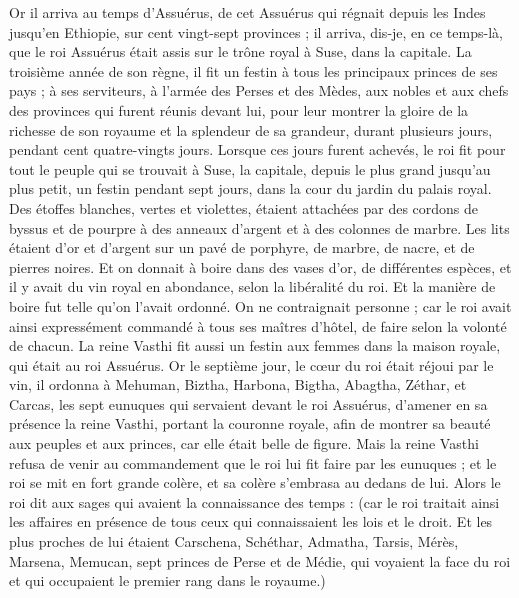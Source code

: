 \begin{multicols}{2}
\VerseOne{}Or il arriva au temps d’Assuérus, de cet Assuérus qui régnait depuis les Indes jusqu'en Ethiopie, sur cent vingt-sept provinces ;
il arriva, dis-je, en ce temps-là, que le roi Assuérus était assis sur le trône royal à Suse, dans la capitale.
La troisième année de son règne, il fit un festin à tous les principaux princes de ses pays ; à ses serviteurs, à l’armée des Perses et des Mèdes, aux nobles et aux chefs des provinces qui furent réunis devant lui,
pour leur montrer la gloire de la richesse de son royaume et la splendeur de sa grandeur, durant plusieurs jours, pendant cent quatre-vingts jours.
Lorsque ces jours furent achevés, le roi fit pour tout le peuple qui se trouvait à Suse, la capitale, depuis le plus grand jusqu'au plus petit, un festin pendant sept jours, dans la cour du jardin du palais royal.
Des étoffes blanches, vertes et violettes, étaient attachées par des cordons de byssus et de pourpre à des anneaux d'argent et à des colonnes de marbre. Les lits étaient d'or et d'argent sur un pavé de porphyre, de marbre, de nacre, et de pierres noires.
Et on donnait à boire dans des vases d'or, de différentes espèces, et il y avait du vin royal en abondance, selon la libéralité du roi.
Et la manière de boire fut telle qu’on l’avait ordonné. On ne contraignait personne ; car le roi avait ainsi expressément commandé à tous ses maîtres d’hôtel, de faire selon la volonté de chacun.
La reine Vasthi fit aussi un festin aux femmes dans la maison royale, qui était au roi Assuérus.
Or le septième jour, le cœur du roi était réjoui par le vin, il ordonna à Mehuman, Biztha, Harbona, Bigtha, Abagtha, Zéthar, et Carcas, les sept eunuques qui servaient devant le roi Assuérus,
d’amener en sa présence la reine Vasthi, portant la couronne royale, afin de montrer sa beauté aux peuples et aux princes, car elle était belle de figure.
Mais la reine Vasthi refusa de venir au commandement que le roi lui fit faire par les eunuques ; et le roi se mit en fort grande colère, et sa colère s’embrasa au dedans de lui.
Alors le roi dit aux sages qui avaient la connaissance des temps : (car le roi traitait ainsi les affaires en présence de tous ceux qui connaissaient les lois et le droit.
Et les plus proches de lui étaient Carschena, Schéthar, Admatha, Tarsis, Mérès, Marsena, Memucan, sept princes de Perse et de Médie, qui voyaient la face du roi et qui occupaient le premier rang dans le royaume.)

\end{multicols}
